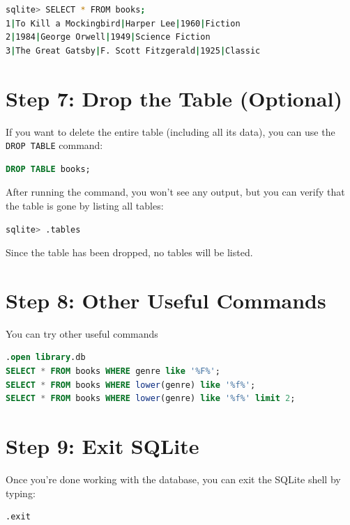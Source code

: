 \documentclass{article}
\begin{document}
\begin{lstlisting}[language=bash]
sqlite> SELECT * FROM books;
1|To Kill a Mockingbird|Harper Lee|1960|Fiction
2|1984|George Orwell|1949|Science Fiction
3|The Great Gatsby|F. Scott Fitzgerald|1925|Classic
\end{lstlisting}

\section*{Step 7: Drop the Table (Optional)}

If you want to delete the entire table (including all its data), you can use the \texttt{DROP TABLE} command:

\begin{lstlisting}[language=SQL]
DROP TABLE books;
\end{lstlisting}

After running the command, you won't see any output, but you can verify that the table is gone by listing all tables:

\begin{lstlisting}[language=bash]
sqlite> .tables
\end{lstlisting}

Since the table has been dropped, no tables will be listed.



\section*{Step 8: Other Useful Commands}

You can try other useful commands

\begin{lstlisting}[language=SQL]
.open library.db  
SELECT * FROM books WHERE genre like '%F%';
SELECT * FROM books WHERE lower(genre) like '%f%';
SELECT * FROM books WHERE lower(genre) like '%f%' limit 2;
\end{lstlisting}


\section*{Step 9: Exit SQLite}

Once you're done working with the database, you can exit the SQLite shell by typing:

\begin{lstlisting}[language=bash]
.exit
\end{lstlisting}
\end{document}
